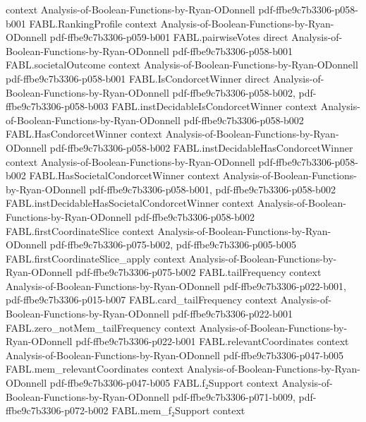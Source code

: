 \begin{theorem}
  {context}
  {Analysis-of-Boolean-Functions-by-Ryan-ODonnell}
  {pdf-ffbe9c7b3306-p058-b001}
\proofstep
  {FABL.RankingProfile}
  {context}
  {Analysis-of-Boolean-Functions-by-Ryan-ODonnell}
  {pdf-ffbe9c7b3306-p059-b001}
\proofstep
  {FABL.pairwiseVotes}
  {direct}
  {Analysis-of-Boolean-Functions-by-Ryan-ODonnell}
  {pdf-ffbe9c7b3306-p058-b001}
\proofstep
  {FABL.societalOutcome}
  {context}
  {Analysis-of-Boolean-Functions-by-Ryan-ODonnell}
  {pdf-ffbe9c7b3306-p058-b001}
\proofstep
  {FABL.IsCondorcetWinner}
  {direct}
  {Analysis-of-Boolean-Functions-by-Ryan-ODonnell}
  {pdf-ffbe9c7b3306-p058-b002,
    pdf-ffbe9c7b3306-p058-b003}
\proofstep
  {FABL.instDecidableIsCondorcetWinner}
  {context}
  {Analysis-of-Boolean-Functions-by-Ryan-ODonnell}
  {pdf-ffbe9c7b3306-p058-b002}
\proofstep
  {FABL.HasCondorcetWinner}
  {context}
  {Analysis-of-Boolean-Functions-by-Ryan-ODonnell}
  {pdf-ffbe9c7b3306-p058-b002}
\proofstep
  {FABL.instDecidableHasCondorcetWinner}
  {context}
  {Analysis-of-Boolean-Functions-by-Ryan-ODonnell}
  {pdf-ffbe9c7b3306-p058-b002}
\proofstep
  {FABL.HasSocietalCondorcetWinner}
  {context}
  {Analysis-of-Boolean-Functions-by-Ryan-ODonnell}
  {pdf-ffbe9c7b3306-p058-b001,
    pdf-ffbe9c7b3306-p058-b002}
\proofstep
  {FABL.instDecidableHasSocietalCondorcetWinner}
  {context}
  {Analysis-of-Boolean-Functions-by-Ryan-ODonnell}
  {pdf-ffbe9c7b3306-p058-b002}
\proofstep
  {FABL.firstCoordinateSlice}
  {context}
  {Analysis-of-Boolean-Functions-by-Ryan-ODonnell}
  {pdf-ffbe9c7b3306-p075-b002,
    pdf-ffbe9c7b3306-p005-b005}
\proofstep
  {FABL.firstCoordinateSlice_apply}
  {context}
  {Analysis-of-Boolean-Functions-by-Ryan-ODonnell}
  {pdf-ffbe9c7b3306-p075-b002}
\proofstep
  {FABL.tailFrequency}
  {context}
  {Analysis-of-Boolean-Functions-by-Ryan-ODonnell}
  {pdf-ffbe9c7b3306-p022-b001,
    pdf-ffbe9c7b3306-p015-b007}
\proofstep
  {FABL.card_tailFrequency}
  {context}
  {Analysis-of-Boolean-Functions-by-Ryan-ODonnell}
  {pdf-ffbe9c7b3306-p022-b001}
\proofstep
  {FABL.zero_notMem_tailFrequency}
  {context}
  {Analysis-of-Boolean-Functions-by-Ryan-ODonnell}
  {pdf-ffbe9c7b3306-p022-b001}
\proofstep
  {FABL.relevantCoordinates}
  {context}
  {Analysis-of-Boolean-Functions-by-Ryan-ODonnell}
  {pdf-ffbe9c7b3306-p047-b005}
\proofstep
  {FABL.mem_relevantCoordinates}
  {context}
  {Analysis-of-Boolean-Functions-by-Ryan-ODonnell}
  {pdf-ffbe9c7b3306-p047-b005}
\proofstep
  {FABL.f₂Support}
  {context}
  {Analysis-of-Boolean-Functions-by-Ryan-ODonnell}
  {pdf-ffbe9c7b3306-p071-b009,
    pdf-ffbe9c7b3306-p072-b002}
\proofstep
  {FABL.mem_f₂Support}
  {context}

\end{theorem}
